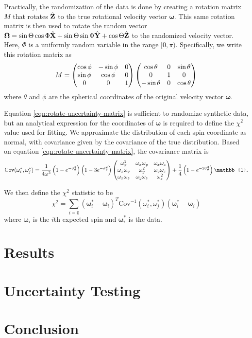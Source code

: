 \documentclass[11pt]{article}
\begin{document}
Practically, the randomization of the data is done by creating a rotation matrix $M$ that rotates $\hat{\mathbf{Z}}$ to the true rotational velocity vector $\bm \omega$. This same rotation matrix is then used to rotate the random vector $\bm \Omega = \sin \Theta \cos\Phi \hat{\mathbf{X}} + \sin \Theta \sin \Phi\hat{\mathbf{Y}} + \cos \Theta\hat{\mathbf{Z}}$ to the randomized velocity vector. Here, $\Phi$ is a uniformly random variable in the range $[0, \pi)$. Specifically, we write this rotation matrix as
\begin{equation}
M = \left( \begin{matrix}
\cos \phi & -\sin \phi & 0\\
\sin \phi & \cos \phi & 0\\
0 & 0 & 1
\end{matrix} \right)
\left( \begin{matrix}
\cos \theta & 0 & \sin \theta \\
0 & 1 & 0\\
-\sin \theta & 0 & \cos \theta
\end{matrix} \right)
\label{eqn:rotate-uncertainty-matrix}
\end{equation}
where $\theta$ and $\phi$ are the spherical coordinates of the original velocity vector $\bm \omega.$

Equation \ref{eqn:rotate-uncertainty-matrix} is sufficient to randomize synthetic data, but an analytical expression for the coordinates of $\bm \omega$ is required to define the $\chi^2$ value used for fitting. We approximate the distribution of each spin coordinate as normal, with covariance given by the covariance of the true distribution. Based on equation \ref{eqn:rotate-uncertainty-matrix}, the covariance matrix is
\begin{equation}
\text{Cov}(\omega^*_i, \omega^*_j) = \frac{1}{4 \omega^2}\parens{1-e^{-\sigma_\theta^2}} \parens{1-3e^{-\sigma_\theta^2}}\parens{\begin{matrix}
\omega_x^2 & \omega_x \omega_y& \omega_x \omega_z\\
\omega_x \omega_y & \omega_y^2 & \omega_y \omega_z\\
\omega_x \omega_z & \omega_y \omega_z& \omega_z^2
\end{matrix}} +  \frac{1}{4}\parens{1 - e^{-2\sigma_\theta^2}} \mathbb{1}.
\label{eqn:rotate-uncertainty-var}
\end{equation}

We then define the $\chi^2$ statistic to be
\begin{equation}
\chi^2 = \sum_{i=0} (\bm \omega_i^* - \bm \omega_i)^T\text{Cov}^{-1}(\omega^*_i, \omega^*_j)(\bm \omega_i^* - \bm \omega_i)
\end{equation}
where $\bm \omega_i$ is the $i$th expected spin and $\bm \omega_i^*$ is the data.



\section{Results}

\section{Uncertainty Testing}

\section{Conclusion}



\end{document}
